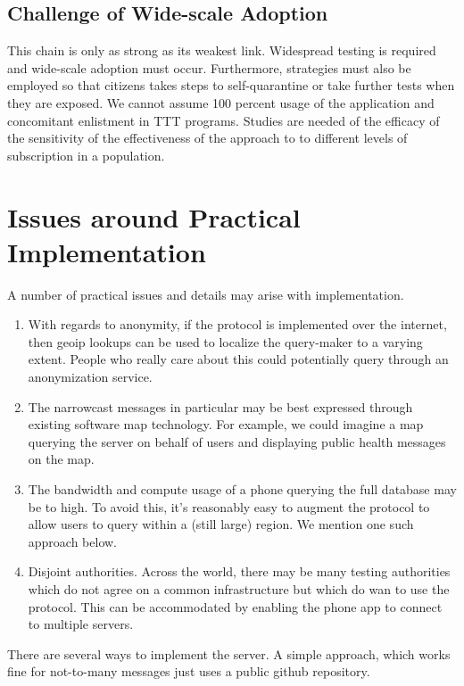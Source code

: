 \documentclass{article}
\begin{document}
\subsection{Challenge of Wide-scale Adoption}
This chain is only as strong as its weakest link.  Widespread testing is required and wide-scale adoption must occur. Furthermore, strategies must also be employed so that citizens takes steps to self-quarantine or take further tests when they are exposed. We cannot assume 100 percent usage of the application and concomitant enlistment in TTT programs.  Studies are needed of the efficacy of the sensitivity of the effectiveness of the approach to to different levels of subscription in a population.

\appendix

\section{Issues around Practical Implementation}

A number of practical issues and details may arise with implementation.
\begin{enumerate}
    \item With regards to anonymity, if the protocol is implemented over the internet, then geoip lookups can be used to localize the query-maker to a varying extent.  People who really care about this could potentially query through an anonymization service.
    \item The narrowcast messages in particular may be best expressed through existing software map technology.   For example, we could imagine a map querying the server on behalf of users and displaying public health messages on the map.  
    \item The bandwidth and compute usage of a phone querying the full database may be to high.  To avoid this, it's reasonably easy to augment the protocol to allow users to query within a (still large) region.  We mention one such approach below.  
    \item Disjoint authorities.  Across the world, there may be many testing authorities which do not agree on a common infrastructure but which do wan to use the protocol.  This can be accommodated by enabling the phone app to connect to multiple servers. 
\end{enumerate}

There are several ways to implement the server.  A simple approach, which works fine for not-to-many messages just uses a public github repository.
\end{document}
